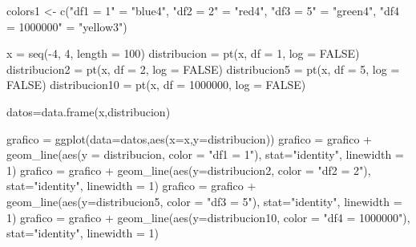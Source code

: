 \documentclass[
]{article}
\newenvironment{Shaded}{\begin{snugshade}}{\end{snugshade}}
\newcommand{\AttributeTok}[1]{\textcolor[rgb]{0.77,0.63,0.00}{#1}}
\newcommand{\ConstantTok}[1]{\textcolor[rgb]{0.00,0.00,0.00}{#1}}
\newcommand{\DecValTok}[1]{\textcolor[rgb]{0.00,0.00,0.81}{#1}}
\newcommand{\FunctionTok}[1]{\textcolor[rgb]{0.00,0.00,0.00}{#1}}
\newcommand{\NormalTok}[1]{#1}
\newcommand{\OtherTok}[1]{\textcolor[rgb]{0.56,0.35,0.01}{#1}}
\newcommand{\SpecialCharTok}[1]{\textcolor[rgb]{0.00,0.00,0.00}{#1}}
\newcommand{\StringTok}[1]{\textcolor[rgb]{0.31,0.60,0.02}{#1}}
\begin{document}
\begin{Shaded}
\begin{Highlighting}[]
\NormalTok{colors1 }\OtherTok{\textless{}{-}} \FunctionTok{c}\NormalTok{(}\StringTok{"df1 = 1"} \OtherTok{=} \StringTok{"blue4"}\NormalTok{, }\StringTok{"df2 = 2"} \OtherTok{=} \StringTok{"red4"}\NormalTok{, }\StringTok{"df3 = 5"} \OtherTok{=} \StringTok{"green4"}\NormalTok{, }\StringTok{"df4 = 1000000"} \OtherTok{=} \StringTok{"yellow3"}\NormalTok{)}

\NormalTok{x }\OtherTok{=} \FunctionTok{seq}\NormalTok{(}\SpecialCharTok{{-}}\DecValTok{4}\NormalTok{, }\DecValTok{4}\NormalTok{, }\AttributeTok{length =} \DecValTok{100}\NormalTok{)}
\NormalTok{distribucion }\OtherTok{=} \FunctionTok{pt}\NormalTok{(x, }\AttributeTok{df =} \DecValTok{1}\NormalTok{, }\AttributeTok{log =} \ConstantTok{FALSE}\NormalTok{)}
\NormalTok{distribucion2 }\OtherTok{=} \FunctionTok{pt}\NormalTok{(x, }\AttributeTok{df =} \DecValTok{2}\NormalTok{, }\AttributeTok{log =} \ConstantTok{FALSE}\NormalTok{)}
\NormalTok{distribucion5 }\OtherTok{=} \FunctionTok{pt}\NormalTok{(x, }\AttributeTok{df =} \DecValTok{5}\NormalTok{, }\AttributeTok{log =} \ConstantTok{FALSE}\NormalTok{)}
\NormalTok{distribucion10 }\OtherTok{=} \FunctionTok{pt}\NormalTok{(x, }\AttributeTok{df =} \DecValTok{1000000}\NormalTok{, }\AttributeTok{log =} \ConstantTok{FALSE}\NormalTok{)}

\NormalTok{datos}\OtherTok{=}\FunctionTok{data.frame}\NormalTok{(x,distribucion)}

\NormalTok{grafico }\OtherTok{=} \FunctionTok{ggplot}\NormalTok{(}\AttributeTok{data=}\NormalTok{datos,}\FunctionTok{aes}\NormalTok{(}\AttributeTok{x=}\NormalTok{x,}\AttributeTok{y=}\NormalTok{distribucion))}
\NormalTok{grafico }\OtherTok{=}\NormalTok{ grafico }\SpecialCharTok{+} \FunctionTok{geom\_line}\NormalTok{(}\FunctionTok{aes}\NormalTok{(}\AttributeTok{y =}\NormalTok{ distribucion, }\AttributeTok{color =} \StringTok{"df1 = 1"}\NormalTok{), }\AttributeTok{stat=}\StringTok{"identity"}\NormalTok{, }\AttributeTok{linewidth =} \DecValTok{1}\NormalTok{)}
\NormalTok{grafico }\OtherTok{=}\NormalTok{ grafico }\SpecialCharTok{+} \FunctionTok{geom\_line}\NormalTok{(}\FunctionTok{aes}\NormalTok{(}\AttributeTok{y=}\NormalTok{distribucion2, }\AttributeTok{color =} \StringTok{"df2 = 2"}\NormalTok{), }\AttributeTok{stat=}\StringTok{"identity"}\NormalTok{, }\AttributeTok{linewidth =} \DecValTok{1}\NormalTok{)}
\NormalTok{grafico }\OtherTok{=}\NormalTok{ grafico }\SpecialCharTok{+} \FunctionTok{geom\_line}\NormalTok{(}\FunctionTok{aes}\NormalTok{(}\AttributeTok{y=}\NormalTok{distribucion5, }\AttributeTok{color =} \StringTok{"df3 = 5"}\NormalTok{), }\AttributeTok{stat=}\StringTok{"identity"}\NormalTok{, }\AttributeTok{linewidth =} \DecValTok{1}\NormalTok{)}
\NormalTok{grafico }\OtherTok{=}\NormalTok{ grafico }\SpecialCharTok{+} \FunctionTok{geom\_line}\NormalTok{(}\FunctionTok{aes}\NormalTok{(}\AttributeTok{y=}\NormalTok{distribucion10, }\AttributeTok{color =} \StringTok{"df4 = 1000000"}\NormalTok{), }\AttributeTok{stat=}\StringTok{"identity"}\NormalTok{, }\AttributeTok{linewidth =} \DecValTok{1}\NormalTok{)}


\end{Highlighting}
\end{Shaded}
\end{document}
